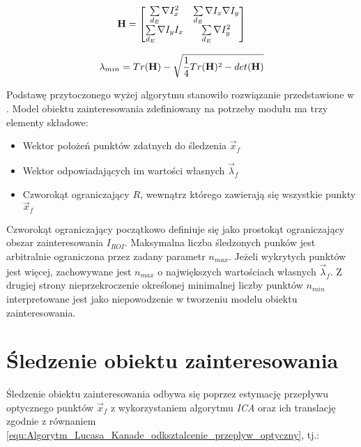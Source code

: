 \begin{equation}
\label{equ:Modul_Lucas_Kanade_hesjan}	
	\mathbf{H} = \begin{bmatrix}
		\sum\limits_{d_E} \nabla I_{x}^2 & \sum\limits_{d_E} \nabla I_{x} \nabla  I_{y} \\
		\sum\limits_{d_E} \nabla I_{y}  I_{x} & \sum\limits_{d_E} \nabla I_{y}^2
	\end{bmatrix}
\end{equation}

\begin{equation}
\label{equ:Modul_Lucas_Kanade_min_wartosc_wlasna}	
	\lambda_{min} = Tr(\mathbf{H}) - \sqrt{\frac{1}{4} Tr(\mathbf{H})^2 - det(\mathbf{H})}
\end{equation}


Podstawę przytoczonego wyżej algorytmu stanowiło rozwiązanie przedstawione w \cite{Bouguet2000}. Model obiektu zainteresowania zdefiniowany na potrzeby modułu ma trzy elementy składowe:

\begin{itemize}

	\item Wektor położeń punktów zdatnych do śledzenia $\vec{x}_f$
	\item Wektor odpowiadających im wartości własnych $\vec{\lambda}_f$
	\item Czworokąt ograniczający $R$, wewnątrz którego zawierają się wszystkie punkty $\vec{x}_f$

\end{itemize}

Czworokąt ograniczający początkowo definiuje się jako prostokąt ograniczający obszar zainteresowania $I_{ROI}$. Maksymalna liczba śledzonych punków jest arbitralnie ograniczona przez zadany parametr $n_{max}$. Jeżeli wykrytych punktów jest więcej, zachowywane jest $n_{max}$ o największych wartościach własnych $\vec{\lambda}_f$. Z drugiej strony nieprzekroczenie określonej minimalnej liczby punktów $n_{min}$ interpretowane jest jako niepowodzenie w tworzeniu modelu obiektu zainteresowania.

\section{Śledzenie obiektu zainteresowania}
\label{sec:LK_Sledzenie_obiektu}

Śledzenie obiektu zainteresowania odbywa się poprzez estymację przepływu optycznego punktów $\vec{x}_f$ z wykorzystaniem algorytmu \textit{ICA} oraz ich translację zgodnie z równaniem \ref{equ:Algorytm_Lucasa_Kanade_odksztalcenie_przeplyw_optyczny}, tj.:

